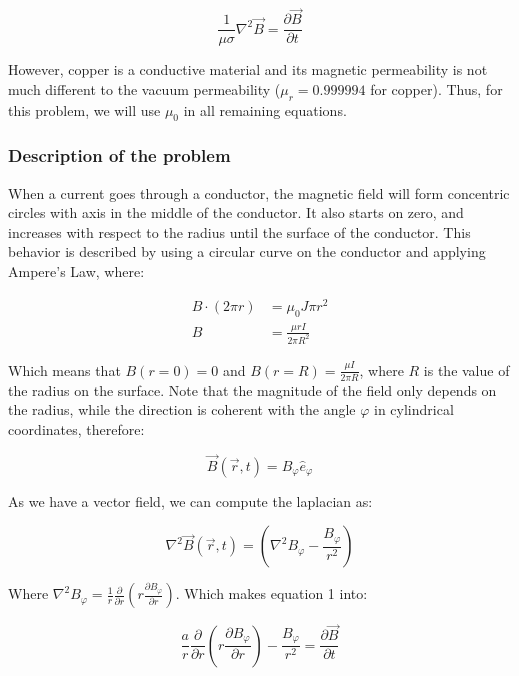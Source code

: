 \documentclass{article}
\begin{document}
\begin{equation}
\frac{1}{\mu \sigma} \nabla^2 \vec{B} = \frac{\partial \vec{B}}{\partial t}
\end{equation}

However, copper is a conductive material and its magnetic permeability is not much different to the vacuum permeability ($\mu_r = 0.999994$ for copper). Thus, for this problem, we will use $\mu_0$ in all remaining equations. 

\subsubsection{Description of the problem}

When a current goes through a conductor, the magnetic field will form concentric circles with axis in the middle of the conductor. It also starts on zero, and increases with respect to the radius until the surface of the conductor. This behavior is described by using a circular curve on the conductor and applying Ampere's Law, where:

\begin{align*}
B \cdot (2\pi r) &= \mu_0 J \pi r^2 \\
B &= \frac{\mu r I}{2 \pi R^2}
\end{align*}

Which means that $B(r=0) = 0$ and $B(r=R) = \frac{\mu I}{2 \pi R}$, where $R$ is the value of the radius on the surface. Note that the magnitude of the field only depends on the radius, while the direction is coherent with the angle $\varphi$ in cylindrical coordinates, therefore:

\begin{equation}
\vec{B}(\vec{r},t) = B_{\varphi} \hat{e}_{\varphi}
\end{equation}

As we have a vector field, we can compute the laplacian as:

\begin{equation}
\nabla^2 \vec{B}(\vec{r},t) = \left(\nabla^2 B_{\varphi} - \frac{B_{\varphi}}{r^2} \right)
\end{equation}

Where $ \nabla^2 B_{\varphi} = \frac{1}{r}\frac{\partial}{\partial r} \left( r \frac{\partial B_{\varphi}}{\partial r}\right)$. Which makes equation 1 into:

\begin{equation}
\frac{a}{r}\frac{\partial}{\partial r} \left( r \frac{\partial B_{\varphi}}{\partial r}\right)- \frac{B_{\varphi}}{r^2} = \frac{\partial \vec{B}}{\partial t}
\end{equation}
\end{document}
